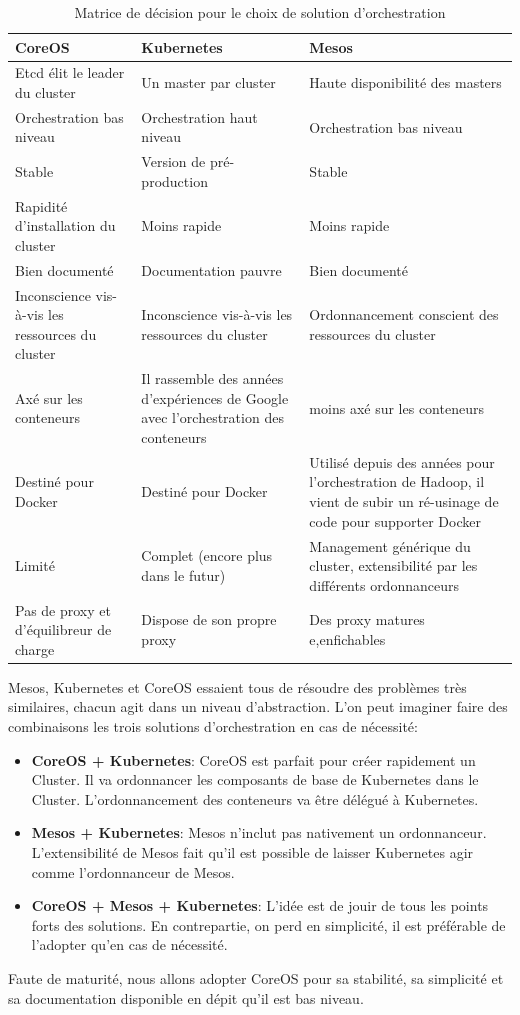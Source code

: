 {
\begin{center}
\begin{table}[H]

	\caption{Matrice de décision pour le choix de solution d'orchestration \label{tab:table_label}}
	\begin{tabu}{| X[c] | X[c] | X[c] |} 


	\hline
	\textbf{CoreOS} & \textbf{Kubernetes} & \textbf{Mesos}\\ [0.95ex] 
	\hline\hline
	Etcd élit le leader du cluster 	& Un master par cluster & Haute disponibilité des masters \\ 
	Orchestration bas niveau & Orchestration haut niveau & Orchestration bas niveau \\ 
	Stable					& Version de pré-production & Stable \\ 
	Rapidité d’installation du cluster & Moins rapide & Moins rapide \\ 
	Bien documenté & Documentation pauvre & Bien documenté \\ 
	Inconscience vis-à-vis les ressources du cluster & Inconscience vis-à-vis les ressources du cluster & Ordonnancement conscient des ressources du cluster \\ 
	Axé sur les conteneurs & Il rassemble des années d’expériences de Google avec l'orchestration des conteneurs	& moins axé sur les conteneurs \\ 
	Destiné pour Docker & Destiné pour Docker	& Utilisé depuis des années pour l'orchestration de Hadoop, il vient de subir un ré-usinage de code pour supporter Docker \\ 
	Limité & Complet (encore plus dans le futur) & Management générique du cluster, extensibilité par les différents ordonnanceurs \\ 
	Pas de proxy et d'équilibreur de charge & Dispose de son propre proxy & Des proxy matures e,enfichables \\ 
	\hline
	\end{tabu}
\end{table}
\end{center}
}


Mesos, Kubernetes et CoreOS essaient tous de résoudre des problèmes très similaires, chacun agit dans un niveau d'abstraction. L'on peut imaginer faire des combinaisons les trois solutions d'orchestration en cas de nécessité:

\begin{itemize}
	\item \textbf{CoreOS + Kubernetes}: CoreOS est parfait pour créer rapidement un Cluster. Il va ordonnancer les composants de base de Kubernetes dans le Cluster. L'ordonnancement des conteneurs va être délégué à Kubernetes.
	\item \textbf{Mesos + Kubernetes}: Mesos n'inclut pas nativement un ordonnanceur. L'extensibilité de Mesos fait qu'il est possible de laisser Kubernetes agir comme l'ordonnanceur de Mesos.
	\item \textbf{CoreOS + Mesos + Kubernetes}: L'idée est de jouir de tous les points forts des solutions. En contrepartie, on perd en simplicité, il est préférable de l'adopter qu'en cas de nécessité.
\end{itemize}

Faute de maturité, nous allons adopter CoreOS pour sa stabilité, sa simplicité et sa documentation disponible en dépit qu'il est bas niveau.